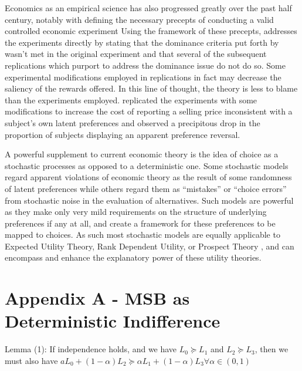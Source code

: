 \documentclass[11pt,a4paper]{report}
\begin{document}
Economics as an empirical science has also progressed greatly over the past half century, notably with \textcite{Smith1982} defining the necessary precepts of conducting a valid controlled economic experiment
Using the framework of these precepts, \textcite{Harrison1994} addresses the \textcite{Grether1979} experiments directly by stating that the dominance criteria put forth by \textcite{Smith1982} wasn't met in the original experiment and that several of the subsequent replications which purport to address the dominance issue do not do so.
Some experimental modifications employed in replications in fact may decrease the saliency of the rewards offered.
In this line of thought, the theory is less to blame than the experiments employed.
\textcite[236-239]{Harrison1994} replicated the\textcite{Grether1979} experiments with some modifications to increase the cost of reporting a selling price inconsistent with a subject's own latent preferences and observed a precipitous drop in the proportion of subjects displaying an apparent preference reversal.

A powerful supplement to current economic theory is the idea of choice as a stochastic processes as opposed to a deterministic one.
Some stochastic models regard apparent violations of economic theory as the result of some randomness of latent preferences while others regard them as \enquote{mistakes} or \enquote{choice errors} from stochastic noise in the evaluation of alternatives.
Such models are powerful as they make only very mild requirements on the structure of underlying preferences if any at all, and create a framework for these preferences to be mapped to choices.
As such most stochastic models are equally applicable to Expected Utility Theory, Rank Dependent Utility, or Prospect Theory \parencite{Kahneman1979, Tversky1992}, and can encompass and enhance the explanatory power of these utility theories.

\break

\section{Appendix A - MSB as Deterministic Indifference}

Lemma (1): If independence holds, and we have $L_0 \succeq L_1$ and $L_2 \succeq L_3$, then we must also have $aL_0 + (1-\alpha)L_2 \succeq \alpha L_1 + (1 - \alpha) L_3 \forall \alpha \in (0,1)$
\end{document}
